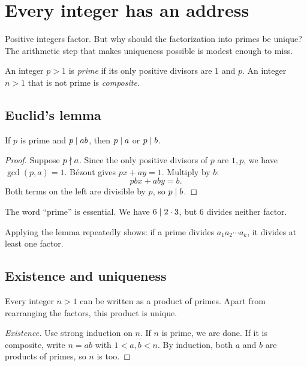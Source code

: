 \chapter{Every integer has an address}

Positive integers factor. But why should the factorization into primes be unique? The arithmetic step that makes uniqueness possible is modest enough to miss.

\begin{definition}
An integer $p>1$ is \emph{prime} if its only positive divisors are $1$ and $p$. An integer $n>1$ that is not prime is \emph{composite}.
\end{definition}

\section{Euclid's lemma}

\begin{lemma}[Euclid]
If $p$ is prime and $p\mid ab$, then $p\mid a$ or $p\mid b$.
\end{lemma}

\begin{proof}
Suppose $p\nmid a$. Since the only positive divisors of $p$ are $1,p$, we have $\gcd(p,a)=1$. B\'ezout gives $px+ay=1$. Multiply by $b$:
\[
pbx+aby=b.
\]
Both terms on the left are divisible by $p$, so $p\mid b$.
\end{proof}

\begin{warningbox}
The word ``prime'' is essential. We have $6\mid 2\cdot3$, but $6$ divides neither factor.
\end{warningbox}

Applying the lemma repeatedly shows: if a prime divides $a_1a_2\cdots a_k$, it divides at least one factor.

\section{Existence and uniqueness}

\begin{theorem}
Every integer $n>1$ can be written as a product of primes. Apart from rearranging the factors, this product is unique.
\end{theorem}

\begin{proof}[Existence]
Use strong induction on $n$. If $n$ is prime, we are done. If it is composite, write $n=ab$ with $1<a,b<n$. By induction, both $a$ and $b$ are products of primes, so $n$ is too.
\end{proof}

